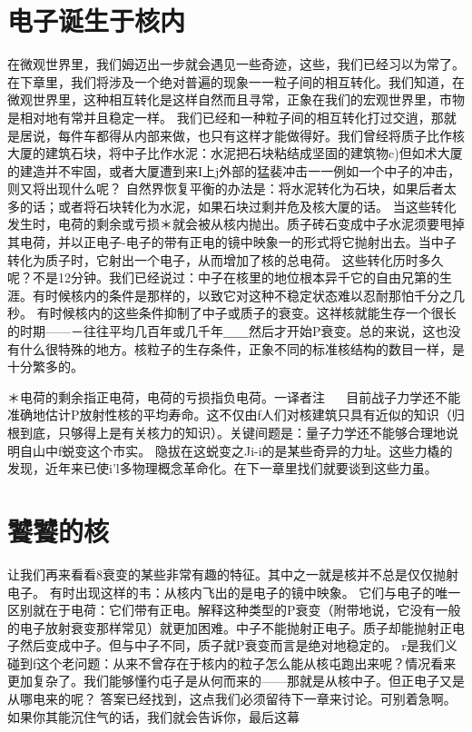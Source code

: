 {{\section{电子诞生于核内}

在微观世界里，我们姆迈出一步就会遇见一些奇迹，这些，我们已经习以为常了。在下章里，我们将涉及一个绝对普遍的现象一一粒子间的相互转化。我们知道，在微观世界里，这种相互转化是这样自然而且寻常，正象在我们的宏观世界里，市物是相对地有常并且稳定一样。
我们已经和一种粒子间的相互转化打过交逍，那就是居说，每件车都得从内部来做，也只有这样才能做得好。我们曾经将质子比作核大厦的建筑石块，将中子比作水泥：水泥把石块粘结成坚固的建筑物c)但如术大厦的建造并不牢固，或者大厦遭到来I上j外部的猛裴冲击一一例如一个中子的冲击，则又将出现什么呢？
自然界恢复平衡的办法是：将水泥转化为石块，如果后者太多的话；或者将石块转化为水泥，如果石块过剩并危及核大厦的话。
当这些转化发生时，电荷的剩余或亏损＊就会被从核内抛出。质子砖石变成中子水泥须要甩掉其电荷，并以正电子-电子的带有正电的镜中映象一的形式将它抛射出去。当中子转化为质子时，它射出一个电子，从而增加了核的总电荷。
这些转化历时多久呢？不是12分钟。我们已经说过：中子在核里的地位根本异千它的自由兄第的生涯。有时候核内的条件是那样的，以致它对这种不稳定状态难以忍耐那怕千分之几秒。
有时候核内的这些条件抑制了中子或质子的衰变。这祥核就能生存一个很长的时期——－往往平均几百年或几千年＿＿然后才开始P衰变。总的来说，这也没有什么很特殊的地方。核粒子的生存条件，正象不同的标准核结构的数目一样，是十分繁多的。

＊电荷的剩余指正电荷，电荷的亏损指负电荷。一译者注
  
目前战子力学还不能准确地估计P放射性核的平均寿命。这不仅由f人们对核建筑只具有近似的知识（归根到底，只够得上是有关核力的知识）。关键间题是：量子力学还不能够合理地说明自山中f蜕变这个市实。
隐拔在这蜕变之Ji-i的是某些奇异的力址。这些力橇的发现，近年来已使i'l多物理概念革命化。在下一章里找们就要谈到这些力虽。

\section{饕饕的核}

让我们再来看看8衰变的某些非常有趣的特征。其中之一就是核并不总是仅仅抛射电子。
有时出现这样的韦：从核内飞出的是电子的镜中映象。
它们与电子的唯一区别就在于电荷：它们带有正电。解释这种类型的P衰变（附带地说，它没有一般的电子放射衰变那样常见）就更加困难。中子不能抛射正电子。质子却能抛射正电子然后变成中子。但与中子不同，质子就P衰变而言是绝对地稳定的。
r是我们义碰到f这个老问题：从来不曾存在于核内的粒子怎么能从核屯跑出来呢？情况看来更加复杂了。我们能够懂彴屯子是从何而来的——那就是从核中子。但正电子又是从哪电来的呢？
答案已经找到，这点我们必须留待下一章来讨论。可别着急啊。如果你其能沉住气的话，我们就会告诉你，最后这幕

}}
